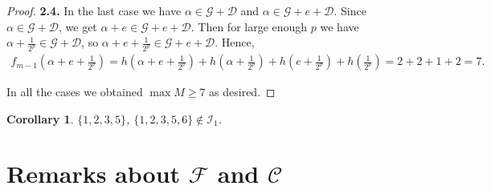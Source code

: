 \documentclass{amsart}
\newtheorem{corollary}[theorem]{Corollary}
\theoremstyle{definition}
\begin{document}
\begin{proof}
\vspace{0.15cm}

\noindent
{\bf 2.4.} In the last case we have $\alpha\in \mathcal{G}+\mathcal{D}$ and $\alpha\in \mathcal{G}+e+\mathcal{D}$.
Since $\alpha\in \mathcal{G}+\mathcal{D}$, we get $\alpha+e\in \mathcal{G}+e+\mathcal{D}$. Then for large enough $p$ we have $\alpha+\frac{1}{2^p}\in \mathcal{G}+\mathcal{D}$, so $\alpha+e+\frac{1}{2^p}\in \mathcal{G}+e+\mathcal{D}.$ Hence, 
\begin{align*}
f_{m-1}\left(\alpha+e+\frac{1}{2^p}\right)=h\left(\alpha+e+\frac{1}{2^p}\right)+h\left(\alpha+\frac{1}{2^p}\right)+h\left(e+\frac{1}{2^p}\right)+h\left(\frac{1}{2^p}\right)=2+2+1+2=7.
\end{align*}

In all the cases we obtained $\max M\geq 7$ as desired.
\end{proof}


\begin{corollary}
$\{1,2,3,5\}$, $\{1,2,3,5,6\}\notin \mathcal{I}_1$.
\end{corollary}

\section{Remarks about $\mathcal{F}$ and $\mathcal{C}$}
\end{document}
